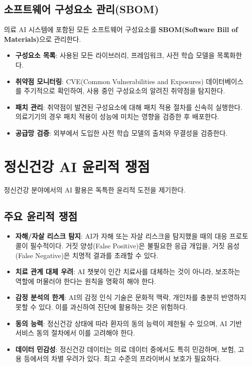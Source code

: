 \subsection{소프트웨어 구성요소 관리(SBOM)}

의료 AI 시스템에 포함된 모든 소프트웨어 구성요소를 \textbf{SBOM(Software Bill of Materials)}으로 관리한다.

\begin{itemize}
 \item \textbf{구성요소 목록}: 사용된 모든 라이브러리, 프레임워크, 사전 학습 모델을 목록화한다.
 \item \textbf{취약점 모니터링}: CVE(Common Vulnerabilities and Exposures) 데이터베이스를 주기적으로 확인하여, 사용 중인 구성요소의 알려진 취약점을 탐지한다.
 \item \textbf{패치 관리}: 취약점이 발견된 구성요소에 대해 패치 적용 절차를 신속히 실행한다. 의료기기의 경우 패치 적용이 성능에 미치는 영향을 검증한 후 배포한다.
 \item \textbf{공급망 검증}: 외부에서 도입한 사전 학습 모델의 출처와 무결성을 검증한다.
\end{itemize}

\section{정신건강 AI 윤리적 쟁점}
\label{sec:16.4.4}

정신건강 분야에서의 AI 활용은 독특한 윤리적 도전을 제기한다.

\subsection{주요 윤리적 쟁점}

\begin{itemize}
 \item \textbf{자해/자살 리스크 탐지}: AI가 자해 또는 자살 리스크을 탐지했을 때의 대응 프로토콜이 필수적이다. 거짓 양성(False Positive)은 불필요한 응급 개입을, 거짓 음성(False Negative)은 치명적 결과를 초래할 수 있다.
 \item \textbf{치료 관계 대체 우려}: AI 챗봇이 인간 치료사를 대체하는 것이 아니라, 보조하는 역할에 머물러야 한다는 원칙을 명확히 해야 한다.
 \item \textbf{감정 분석의 한계}: AI의 감정 인식 기술은 문화적 맥락, 개인차를 충분히 반영하지 못할 수 있다. 이를 과신하여 진단에 활용하는 것은 위험하다.
 \item \textbf{동의 능력}: 정신건강 상태에 따라 환자의 동의 능력이 제한될 수 있으며, AI 기반 서비스 동의 절차에서 이를 고려해야 한다.
 \item \textbf{데이터 민감성}: 정신건강 데이터는 의료 데이터 중에서도 특히 민감하며, 보험, 고용 등에서의 차별 우려가 있다. 최고 수준의 프라이버시 보호가 필요하다.
\end{itemize}

